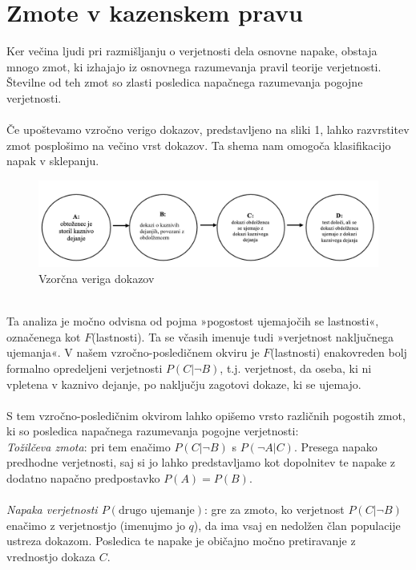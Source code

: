 \documentclass[12pt,a4paper]{amsart}
\theoremstyle{definition} %
\theoremstyle{plain} %
\begin{document}
\section{Zmote v kazenskem pravu}
Ker večina ljudi pri razmišljanju o verjetnosti dela osnovne napake, obstaja mnogo zmot, ki izhajajo iz osnovnega razumevanja pravil
teorije verjetnosti. Številne od teh zmot so zlasti posledica napačnega razumevanja pogojne verjetnosti. \\\\
Če upoštevamo vzročno verigo dokazov, predstavljeno na sliki 1, lahko razvrstitev zmot posplošimo na večino vrst dokazov. Ta shema
nam omogoča klasifikacijo napak v sklepanju.
\begin{figure}[!ht]\label{fig:slika_3}
   \centering
   \includegraphics[scale=0.60]{slika_3.png}
   \caption{Vzorčna veriga dokazov}
\end{figure}
\\
Ta analiza je močno odvisna od pojma »pogostost ujemajočih se lastnosti«, označenega kot $F$(lastnosti). Ta se včasih imenuje
tudi »verjetnost naključnega ujemanja«. V našem vzročno-posledičnem okviru je $F$(lastnosti) enakovreden bolj formalno opredeljeni verjetnosti
$P(C \lvert \neg B)$, t.j. verjetnost, da oseba, ki ni vpletena v kaznivo dejanje, po naključju zagotovi dokaze, ki se ujemajo.\\\\
S tem vzročno-posledičnim okvirom lahko opišemo vrsto različnih pogostih zmot, ki so posledica napačnega razumevanja pogojne verjetnosti:\\
\textit{Tožilčeva zmota}: pri tem enačimo $P(C \lvert \neg B)$ s $P(\neg A \lvert C)$. Presega napako predhodne verjetnosti, saj si jo lahko 
predstavljamo kot dopolnitev te napake z dodatno napačno predpostavko $P(A) = P(B)$.\\\\
\textit{Napaka verjetnosti $P(\text{drugo ujemanje})$}: gre za zmoto, ko verjetnost $P(C \lvert \neg B)$ enačimo z verjetnostjo
(imenujmo jo $q$), da ima vsaj en nedolžen član populacije ustreza dokazom. Posledica te napake je običajno močno pretiravanje z vrednostjo
dokaza $C$.\\\\
\end{document}
